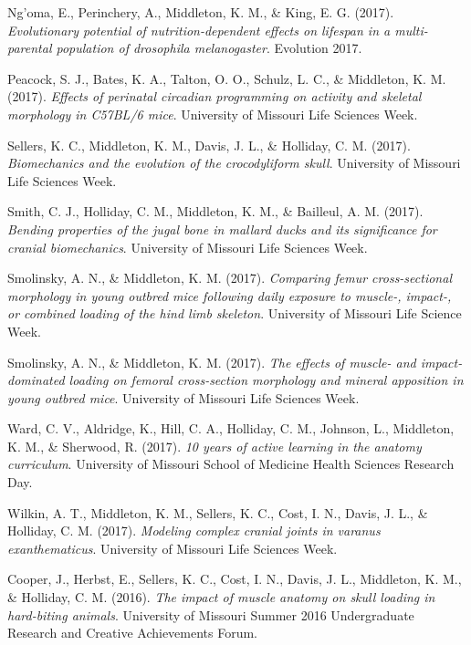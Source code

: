 \documentclass[11pt, a4paper]{awesome-cv}
\begin{document}
\leavevmode\hypertarget{ref-Ngoma2017-ck}{}%
Ng'oma, E., Perinchery, A., Middleton, K. M., \& King, E. G. (2017).
\emph{Evolutionary potential of nutrition-dependent effects on lifespan
in a multi-parental population of \textup{drosophila melanogaster}}.
Evolution 2017.

\leavevmode\hypertarget{ref-Peacock2017-ep}{}%
Peacock, S. J., Bates, K. A., Talton, O. O., Schulz, L. C., \&
Middleton, K. M. (2017). \emph{Effects of perinatal circadian
programming on activity and skeletal morphology in C57BL/6 mice}.
University of Missouri Life Sciences Week.

\leavevmode\hypertarget{ref-Sellers2017-nv}{}%
Sellers, K. C., Middleton, K. M., Davis, J. L., \& Holliday, C. M.
(2017). \emph{Biomechanics and the evolution of the crocodyliform
skull}. University of Missouri Life Sciences Week.

\leavevmode\hypertarget{ref-Smith2017-io}{}%
Smith, C. J., Holliday, C. M., Middleton, K. M., \& Bailleul, A. M.
(2017). \emph{Bending properties of the jugal bone in mallard ducks and
its significance for cranial biomechanics}. University of Missouri Life
Sciences Week.

\leavevmode\hypertarget{ref-Smolinsky2017-fj}{}%
Smolinsky, A. N., \& Middleton, K. M. (2017). \emph{Comparing femur
cross-sectional morphology in young outbred mice following daily
exposure to muscle-, impact-, or combined loading of the hind limb
skeleton}. University of Missouri Life Science Week.

\leavevmode\hypertarget{ref-Smolinsky2017-ht}{}%
Smolinsky, A. N., \& Middleton, K. M. (2017). \emph{The effects of
muscle- and impact-dominated loading on femoral cross-section morphology
and mineral apposition in young outbred mice}. University of Missouri
Life Sciences Week.

\leavevmode\hypertarget{ref-Ward2017-jh}{}%
Ward, C. V., Aldridge, K., Hill, C. A., Holliday, C. M., Johnson, L.,
Middleton, K. M., \& Sherwood, R. (2017). \emph{10 years of active
learning in the anatomy curriculum}. University of Missouri School of
Medicine Health Sciences Research Day.

\leavevmode\hypertarget{ref-Wilkin2017-md}{}%
Wilkin, A. T., Middleton, K. M., Sellers, K. C., Cost, I. N., Davis, J.
L., \& Holliday, C. M. (2017). \emph{Modeling complex cranial joints in
\textup{varanus exanthematicus}}. University of Missouri Life Sciences
Week.

\leavevmode\hypertarget{ref-cooper_impact_2016}{}%
Cooper, J., Herbst, E., Sellers, K. C., Cost, I. N., Davis, J. L.,
Middleton, K. M., \& Holliday, C. M. (2016). \emph{The impact of muscle
anatomy on skull loading in hard-biting animals}. University of Missouri
Summer 2016 Undergraduate Research and Creative Achievements Forum.
\end{document}
